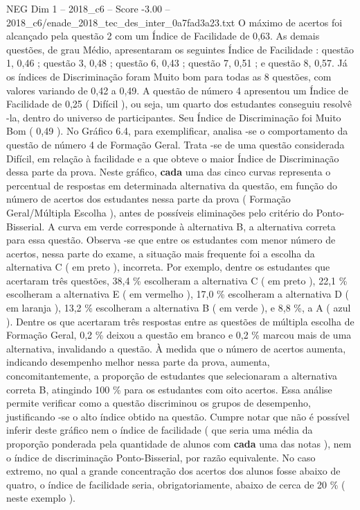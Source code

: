 \begin{textsample}{NEG Dim 1 – 2018\_c6 – Score -3.00 – 2018\_c6/enade\_2018\_tec\_des\_inter\_0a7fad3a23.txt}
O máximo de acertos foi alcançado pela questão 2 com um Índice de Facilidade de 0,63.
As demais questões, de grau Médio, apresentaram os seguintes Índice de Facilidade : questão 1, 0,46 ; questão 3, 0,48 ; questão 6, 0,43 ; questão 7, 0,51 ; e questão 8, 0,57.
Já os índices de Discriminação foram Muito bom para todas as 8 questões, com valores variando de 0,42 a 0,49.
A questão de número 4 apresentou um Índice de Facilidade de 0,25 ( Difícil ), ou seja, um quarto dos estudantes conseguiu resolvê -la, dentro do universo de participantes.
Seu Índice de Discriminação foi Muito Bom ( 0,49 ).
No Gráfico 6.4, para exemplificar, analisa -se o comportamento da questão de número 4 de Formação Geral.
Trata -se de uma questão considerada Difícil, em relação à facilidade e a que obteve o maior Índice de Discriminação dessa parte da prova.
Neste gráfico, \textbf{cada} uma das cinco curvas representa o percentual de respostas em determinada alternativa da questão, em função do número de acertos dos estudantes nessa parte da prova ( Formação Geral/Múltipla Escolha ), antes de possíveis eliminações pelo critério do Ponto-Bisserial.
A curva em verde corresponde à alternativa B, a alternativa correta para essa questão.
Observa -se que entre os estudantes com menor número de acertos, nessa parte do exame, a situação mais frequente foi a escolha da alternativa C ( em preto ), incorreta.
Por exemplo, dentre os estudantes que acertaram três questões, 38,4 \% escolheram a alternativa C ( em preto ), 22,1 \% escolheram a alternativa E ( em vermelho ), 17,0 \% escolheram a alternativa D ( em laranja ), 13,2 \% escolheram a alternativa B ( em verde ), e 8,8 \%, a A ( azul ).
Dentre os que acertaram três respostas entre as questões de múltipla escolha de Formação Geral, 0,2 \% deixou a questão em branco e 0,2 \% marcou mais de uma alternativa, invalidando a questão.
À medida que o número de acertos aumenta, indicando desempenho melhor nessa parte da prova, aumenta, concomitantemente, a proporção de estudantes que selecionaram a alternativa correta B, atingindo 100 \% para os estudantes com oito acertos.
Essa análise permite verificar como a questão discriminou os grupos de desempenho, justificando -se o alto índice obtido na questão.
Cumpre notar que não é possível inferir deste gráfico nem o índice de facilidade ( que seria uma média da proporção ponderada pela quantidade de alunos com \textbf{cada} uma das notas ), nem o índice de discriminação Ponto-Bisserial, por razão equivalente.
No caso extremo, no qual a grande concentração dos acertos dos alunos fosse abaixo de quatro, o índice de facilidade seria, obrigatoriamente, abaixo de cerca de 20 \% ( neste exemplo ).

\end{textsample}
